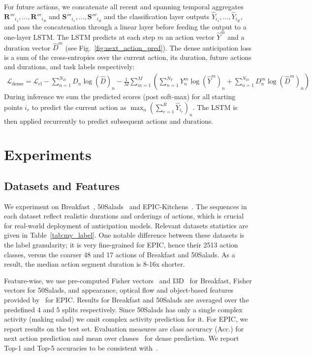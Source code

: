\documentclass[runningheads]{llncs}
\begin{document}
For future actions, we concatenate all recent and spanning temporal aggregates $\textbf{R}'''_{i_1}, ..., \textbf{R}'''_{i_R}$ and $\textbf{S}'''_{i_1}, ..., \textbf{S}'''_{i_R}$ and the classification layer outputs $\hat{Y}_{i_1}, ..., \hat{Y}_{i_R}$, and pass the concatenation through a linear layer before feeding the output to a one-layer LSTM. The LSTM predicts at each step $m$ an action vector $\hat{Y}^{m}$ and a duration vector $\hat{D}^{m}$ (see Fig.~\ref{fig:next_action_pred}).  The dense anticipation loss is a sum of the cross-entropies over the current action, its duration, future actions and durations, and task labels respectively: 
{
{
\begin{align}\label{loss_next_action}
\mathcal{L}_{\text{dense}}\!=\! 
\mathcal{L}_{\text{cl}}\!-\!\sum_{n=1}^{N_D} D_n \log ( \hat{D} )_n\!
-\!\frac{1}{M}\sum_{m=1}^{M}\left(
\sum_{n=1}^{N_Y} Y^{m}_{n}\log(\hat{Y}^{m})_{n} \!+\!
\sum_{n=1}^{N_D} D^{m}_{n}\log(\hat{D}^{m})_{n}\right)
\end{align}
}
}
During inference we sum the predicted scores (post soft-max) for all starting points $i_r$ to predict the current action as $\max_n(\sum_{r = 1}^R \hat{Y}_{i_r})_n$.
The LSTM is then applied recurrently to predict subsequent actions and durations.  
 
\section{Experiments}
\subsection{Datasets and Features}\label{sec:datasets}
We experiment on  Breakfast~\cite{kuehne2014language}, 50Salads~\cite{stein2013combining} and EPIC-Kitchens~\cite{damen2018scaling}. The sequences in each dataset reflect realistic durations and orderings of actions, which is crucial for real-world deployment of anticipation models. Relevant datasets statistics  are given in Table~\ref{tab:my_label}. One notable difference between these datasets is the label granularity; it is very fine-grained for EPIC, hence their 2513 action classes, versus the coarser 48 and 17 actions of Breakfast and 50Salads. As a result, the median action segment duration is 8-16x shorter.
 
Feature-wise, we use pre-computed Fisher vectors~\cite{abu2018will} and I3D~\cite{carreira2017quo} for Breakfast, Fisher vectors for 50Salads, and appearance, optical flow and object-based features  provided by~\cite{furnari2019rulstm} for EPIC. Results for Breakfast and 50Salads are averaged over the predefined 4 and 5 splits respectively. Since 50Salads has only a single complex activity (making salad) we omit complex activity prediction for it. For EPIC, we report results on the test set. Evaluation measures are class accuracy (Acc.) for next action prediction and mean over classes~\cite{abu2018will} for dense prediction. We report Top-1 and Top-5 accuracies to be consistent with~\cite{miech2019leveraging,furnari2019rulstm}. 
\end{document}
